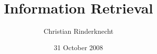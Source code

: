 \documentclass[compress,dvips,xcolor={dvipsnames},t]{beamer}
\title{Information Retrieval}
\author{Christian Rinderknecht}
\date{31 October 2008}
\begin{document}
\frame{\maketitle}










\end{document}
